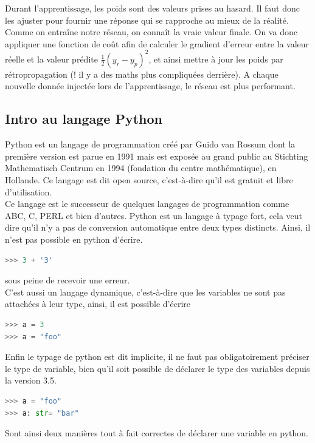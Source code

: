 \documentclass[a4paper, 12pt]{article}
\numberwithin{equation}{subsection}
\begin{document}
Durant l’apprentissage, les poids sont des valeurs prises au hasard. Il faut donc les ajuster pour fournir une réponse qui se rapproche au mieux de la réalité. Comme on entraîne notre réseau, on connaît la vraie valeur finale. On va donc appliquer une fonction de coût afin de calculer le gradient d’erreur entre la valeur réelle et la valeur prédite $ \frac{1}{2}(y_r - y_p)^2 $, et ainsi mettre à jour les poids par rétropropagation (! il y a des maths plus compliquées derrière). A chaque nouvelle donnée injectée lors de l’apprentissage, le réseau est plus performant.
\subsection{Intro au langage Python}
Python est un langage de programmation créé par Guido van Rossum dont la première version est parue en 1991 mais est exposée au grand public au Stichting Mathematisch Centrum en 1994 (fondation du centre mathématique), en Hollande. Ce langage est dit open source, c'est-à-dire qu’il est gratuit et libre d’utilisation.\\

Ce langage est le successeur de quelques langages de programmation comme ABC,  C, PERL et bien d’autres. Python est un langage à typage fort, cela veut dire qu’il n’y a pas de conversion automatique entre deux types distincts. Ainsi, il n’est pas possible en python d’écrire.\\
\begin{lstlisting}[language=Python]
>>> 3 + '3'
\end{lstlisting}
sous peine de recevoir une erreur.\\

C’est aussi un langage dynamique, c’est-à-dire que les variables ne sont pas attachées à leur type, ainsi, il est possible d’écrire \\
\begin{lstlisting}[language=Python]
>>> a = 3
>>> a = "foo"
\end{lstlisting}
Enfin le typage de python est dit implicite, il ne faut pas obligatoirement préciser le type de variable, bien qu’il soit possible de déclarer le type des variables depuis la version 3.5.\\
\begin{lstlisting}[language=Python]
>>> a = "foo"
>>> a: str= "bar"
\end{lstlisting}
Sont ainsi deux manières tout à fait correctes de déclarer une variable en python.\\
\end{document}
